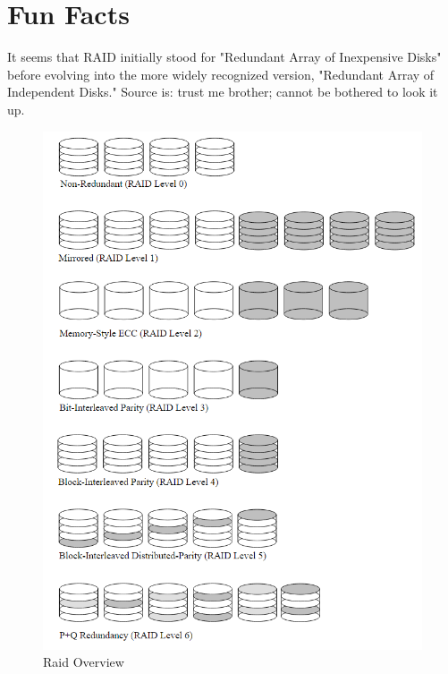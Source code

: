 \documentclass{article}
\begin{document}
\section*{Fun Facts}
It seems that RAID initially stood for "Redundant Array of Inexpensive Disks"
before evolving into the more widely recognized version, "Redundant Array of Independent Disks."
Source is: trust me brother; cannot be bothered to look it up.
\listoffigures
\listoftables


\begin{figure}[h]
    \includegraphics[width=\textwidth]{raid-overview}
    \caption{Raid Overview \cite{cmu:raidhighperf}}
    \label{fig:raid-overview}
\end{figure}
\end{document}
